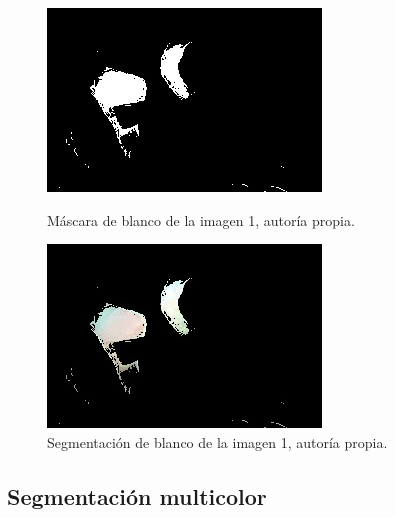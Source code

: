\documentclass[a4paper,12pt]{article}
\begin{document}
{\begin{figure}[H]
  \begin{minipage}[t]{0.45\textwidth}
      \centering
      \includegraphics[width=\textwidth]{processed_data/white_mask_0.jpg}
      \caption{Máscara de blanco de la imagen 1, autoría propia.}
      \label{fig:orange_mask}
  \end{minipage}
  \hfill
  \begin{minipage}[t]{0.45\textwidth}
      \centering
      \includegraphics[width=\textwidth]{processed_data/white_segmented_0.jpg}
      \caption{Segmentación de blanco de la imagen 1, autoría propia.}
      \label{fig:orange_segmented}
  \end{minipage}
\end{figure}

\vspace{0.5cm}

\subsection{Segmentación multicolor}

}
\end{document}
